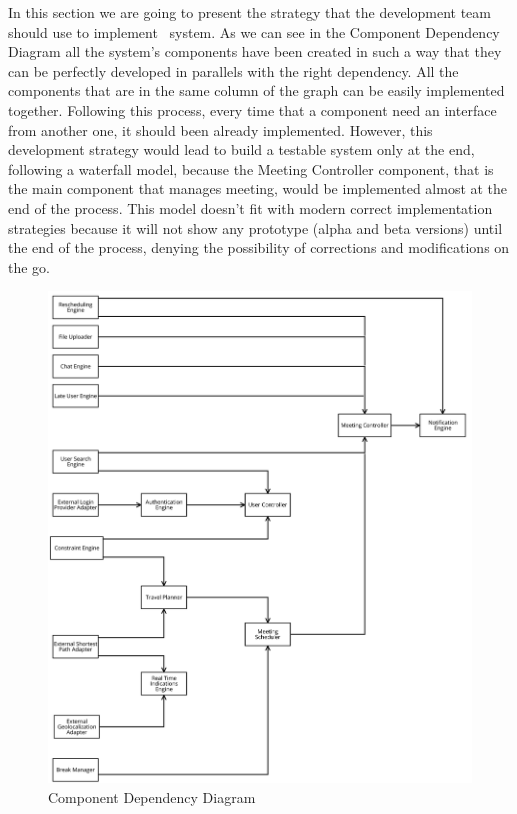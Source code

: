 In this section we are going to present the strategy that the development team should use to implement \projectname~system. As we can see in the Component Dependency Diagram all the system's components have been created in such a way that they can be perfectly developed in parallels with the right dependency. All the components that are in the same column of the graph can be easily implemented together. Following this process, every time that a component need an interface from another one, it should been already implemented. However, this development strategy would lead to build a testable system only at the end, following a waterfall model, because the Meeting Controller component, that is the main component that manages meeting, would be implemented almost at the end of the process. This model doesn't fit with modern correct implementation strategies because it will not show any prototype (alpha and beta versions) until the end of the process, denying the possibility of corrections and modifications on the go.\\

\begin{figure}[!h]
	\centering\includegraphics[scale = 0.22]{Images/UMLDiagrams/DependencyDiagram.png}
	\caption{Component Dependency Diagram}
\end{figure}

